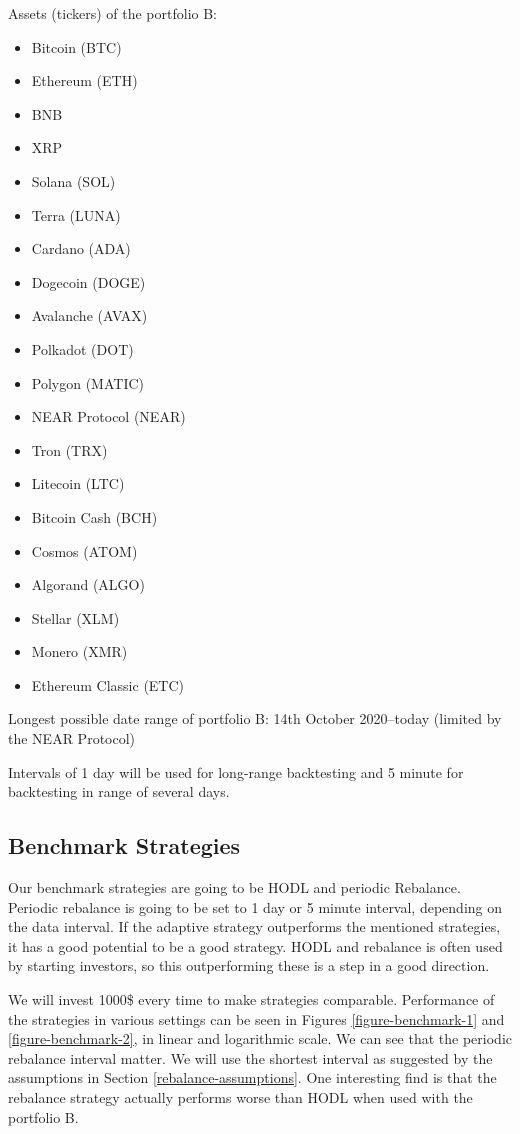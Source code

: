 Assets (tickers) of the portfolio B:
\begin{itemize}
    \item Bitcoin (BTC)
    \item Ethereum (ETH)
    \item BNB
    \item XRP
    \item Solana (SOL)
    \item Terra (LUNA)
    \item Cardano (ADA)
    \item Dogecoin (DOGE)
    \item Avalanche (AVAX)
    \item Polkadot (DOT)
    \item Polygon (MATIC)
    \item NEAR Protocol (NEAR)
    \item Tron (TRX)
    \item Litecoin (LTC)
    \item Bitcoin Cash (BCH)
    \item Cosmos (ATOM)
    \item Algorand (ALGO)
    \item Stellar (XLM)
    \item Monero (XMR)
    \item Ethereum Classic (ETC)
\end{itemize}
Longest possible date range of portfolio B: 14th October 2020--today (limited by the NEAR Protocol)

Intervals of 1 day will be used for long-range backtesting and 5 minute for backtesting in range of several days.

\subsection*{Benchmark Strategies}
Our benchmark strategies are going to be HODL and periodic Rebalance. Periodic rebalance is going to be set to 1 day or 5 minute interval, depending on the data interval. If the adaptive strategy outperforms the mentioned strategies, it has a good potential to be a good strategy. HODL and rebalance is often used by starting investors, so this outperforming these is a step in a good direction.

We will invest 1000\$ every time to make strategies comparable. Performance of the strategies in various settings can be seen in Figures \ref{figure-benchmark-1} and \ref{figure-benchmark-2}, in linear and logarithmic scale. We can see that the periodic rebalance interval matter. We will use the shortest interval as suggested by the assumptions in Section \ref{rebalance-assumptions}. One interesting find is that the rebalance strategy actually performs worse than HODL when used with the portfolio B.

